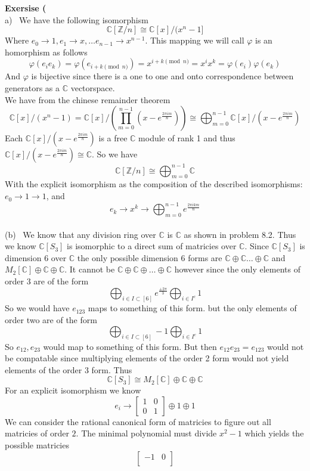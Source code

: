 \documentclass[12pt]{article}
\newenvironment{ques}[1]{\textbf{Exersise #1}\vspace{1 mm}\\ }{\bigskip}
\theoremstyle{definition}
\renewcommand{\l}{\left }
\renewcommand{\r}{\right }
\newcommand{\Z}{\mathbb Z}
\newcommand{\C}{\mathbb C}
\begin{document}
\begin{ques}{9.2}
	(a) \ We have the following isomorphism
	$$\C[\Z/n] \cong \C[x]/(x^n - 1]$$
	Where $e_0 \to 1, e_1 \to x, \dots e_{n-1} \to x^{n-1}$. This mapping we
	will call $\varphi$ is an homorphism as follows
	$$\varphi(e_ie_k) = \varphi(e_{i+k \pmod n}) = x^{i+k \pmod n} = x^ix^k =
	\varphi(e_i)\varphi(e_k)$$
	And $\varphi$ is bijective since there is a one to one and onto correspondence
	between generators as a $\C$ vectorspace.
	\\
	We have from the chinese remainder theorem 
	$$\C[x]/(x^n - 1) = \C[x]/\l(\prod_{m=0}^{n-1} (x - e^{\frac{2\pi im}{n}})
	\r) \cong \bigoplus_{m=0}^{n-1} \C[x]/ (x - e^{\frac{2\pi im}{n}})$$
	Each $\C[x]/ (x - e^{\frac{2\pi im}{n}})$ is a free $\C$ module of rank 1
	and thus $\C[x]/ (x - e^{\frac{2\pi im}{n}}) \cong \C$. So we have 
	$$\C[\Z/n] \cong \bigoplus_{m=0}^{n-1} \C$$
	With the explicit isomorphism as the composition of the described
	isomorphisms: $e_0 \to 1 \to 1$, and $$e_k \to x^k \to
	\bigoplus_{m=0}^{n-1} e^{\frac{2\pi i km}{n}}$$
	\\
	(b) \ We know that any division ring over $\C$ is $\C$ as shown in problem
	8.2. Thus we know $\C[S_3]$ is isomorphic to a direct sum of matricies over
	$\C$. Since $\C[S_3]$ is dimension $6$ over $\C$ the only possible
	dimension $6$ forms are $\C \oplus \C \dots \oplus \C$ and $M_2[\C] \oplus
	\C \oplus \C$. It cannot be $\C \oplus \C \oplus \dots \oplus \C$ however
	since the only elements of order $3$ are of the form 
	$$\bigoplus_{i \in I \subset [6]} e^{\frac{\pm2\pi}{3}} \bigoplus_{i \in
	I^c} 1$$
	So we would have $e_{123}$ maps to something of this form. but the only
	elements of order two are of the form
	$$\bigoplus_{i \in I \subset [6]} -1 \bigoplus_{i \in
	I^c} 1$$
	So $e_{12}, e_{23}$ would map to something of this form. But then
	$e_{12}e_{23} = e_{123}$ would not be compatable since multiplying elements
	of the order 2 form would not yield elements of the order 3 form. Thus 
	$$\C[S_3] \cong M_2[\C] \oplus \C \oplus \C$$
	For an explicit isomorphism we know 
	$$e_i \to 
	\begin{bmatrix}
		1 & 0 \\
		0 & 1
	\end{bmatrix}
	\oplus 1 \oplus 1$$
	We can consider the rational canonical form of matricies to figure out all
	matricies of order $2$. The minimal polynomial must divide $x^2 - 1$ which
	yields the possible matricies
	$$
	\begin{bmatrix}
		- 1 & 0 \\

\end{bmatrix}$$
\end{ques}
\end{document}
